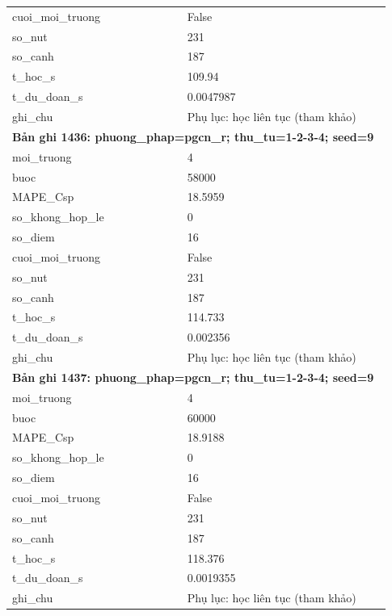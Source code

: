 \begin{longtable}{p{0.43\linewidth}p{0.50\linewidth}}
cuoi\_\allowbreak moi\_\allowbreak truong & False \\
so\_\allowbreak nut & 231 \\
so\_\allowbreak canh & 187 \\
t\_\allowbreak hoc\_\allowbreak s & 109.94 \\
t\_\allowbreak du\_\allowbreak doan\_\allowbreak s & 0.0047987 \\
ghi\_\allowbreak chu & Phụ lục: học liên tục (tham khảo) \\
\midrule
\multicolumn{2}{p{0.95\linewidth}}{\textbf{Bản ghi 1436: phuong\_phap=pgcn\_r; thu\_tu=1-2-3-4; seed=9}} \\
moi\_\allowbreak truong & 4 \\
buoc & 58000 \\
MAPE\_\allowbreak Csp & 18.5959 \\
so\_\allowbreak khong\_\allowbreak hop\_\allowbreak le & 0 \\
so\_\allowbreak diem & 16 \\
cuoi\_\allowbreak moi\_\allowbreak truong & False \\
so\_\allowbreak nut & 231 \\
so\_\allowbreak canh & 187 \\
t\_\allowbreak hoc\_\allowbreak s & 114.733 \\
t\_\allowbreak du\_\allowbreak doan\_\allowbreak s & 0.002356 \\
ghi\_\allowbreak chu & Phụ lục: học liên tục (tham khảo) \\
\midrule
\multicolumn{2}{p{0.95\linewidth}}{\textbf{Bản ghi 1437: phuong\_phap=pgcn\_r; thu\_tu=1-2-3-4; seed=9}} \\
moi\_\allowbreak truong & 4 \\
buoc & 60000 \\
MAPE\_\allowbreak Csp & 18.9188 \\
so\_\allowbreak khong\_\allowbreak hop\_\allowbreak le & 0 \\
so\_\allowbreak diem & 16 \\
cuoi\_\allowbreak moi\_\allowbreak truong & False \\
so\_\allowbreak nut & 231 \\
so\_\allowbreak canh & 187 \\
t\_\allowbreak hoc\_\allowbreak s & 118.376 \\
t\_\allowbreak du\_\allowbreak doan\_\allowbreak s & 0.0019355 \\
ghi\_\allowbreak chu & Phụ lục: học liên tục (tham khảo) \\

\end{longtable}
